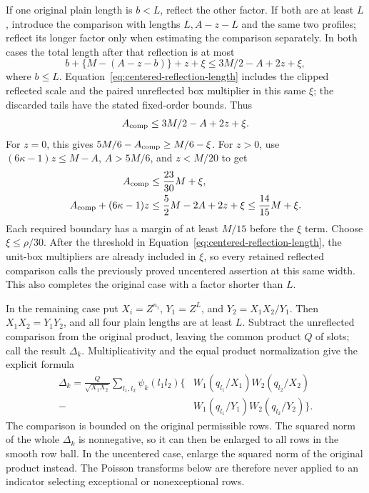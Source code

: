 \documentclass[12pt]{article}
\begin{document}
If one original plain length is \(b<L\), reflect the other factor.
If both are at least \(L\), introduce the comparison with lengths
\(L,A-z-L\) and the same two profiles; reflect its longer factor
only when estimating the comparison separately.  In both cases the
total length after that reflection is at most
\[
 b+\{M-(A-z-b)\}+z+\xi
 \le 3M/2-A+2z+\xi,
\]
where \(b\le L\).  Equation~\eqref{eq:centered-reflection-length}
includes the clipped reflected scale and the paired unreflected box
multiplier in this same \(\xi\); the discarded tails have the stated
fixed-order bounds.  Thus
\begin{equation}
 A_{\rm comp}\le3M/2-A+2z+\xi.
 \label{old-eq:3.11}
\end{equation}
For \(z=0\), this gives
\(5M/6-A_{\rm comp}\ge M/6-\xi\).  For \(z>0\), use
\((6\kappa-1)z\le M-A\), \(A>5M/6\), and \(z<M/20\) to get
\begin{equation}
 \begin{aligned}
 A_{\rm comp}&\le\frac{23}{30}M+\xi,\\
 A_{\rm comp}+(6\kappa-1)z
 &\le\frac52M-2A+2z+\xi\le\frac{14}{15}M+\xi.
 \end{aligned}
 \label{eq:comparison-uncentered-margin}
\end{equation}
Each required boundary has a margin of at least \(M/15\) before
the \(\xi\) term.  Choose \(\xi\le\rho/30\).  After the threshold in
Equation~\eqref{eq:centered-reflection-length}, the unit-box multipliers
are already included in \(\xi\), so every retained reflected
comparison calls the previously proved uncentered assertion at this
same width.  This also completes the original case with a factor
shorter than \(L\).

In the remaining case put \(X_i=Z^{n_i}\),
\(Y_1=Z^L\), and \(Y_2=X_1X_2/Y_1\).  Then
\(X_1X_2=Y_1Y_2\), and all four plain lengths are at least \(L\).
Subtract the unreflected comparison from the original product,
leaving the common product \(Q\) of slots; call the result
\(\Delta_k\).  Multiplicativity and the equal product normalization
give the explicit formula
\[
 \begin{split}
 \Delta_k
 =\frac{Q}{\sqrt{X_1X_2}}\sum_{l_1,l_2}\psi_k(l_1l_2)
 \bigl\{
 &W_1(q_{l_1}/X_1)W_2(q_{l_2}/X_2)\\
 -{}&W_1(q_{l_1}/Y_1)W_2(q_{l_2}/Y_2)
 \bigr\}.
 \end{split}
\]
The comparison is bounded on the original permissible
rows.  The squared norm of the whole \(\Delta_k\) is nonnegative,
so it can then be enlarged to all rows in the smooth row ball.  In
the uncentered case, enlarge the squared norm of the original
product instead.  The Poisson transforms below are therefore never
applied to an indicator selecting exceptional or nonexceptional rows.
\end{document}
